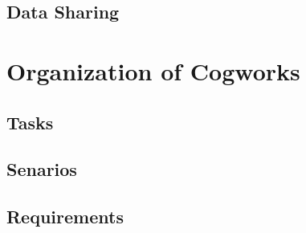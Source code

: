 \subsection{Data Sharing}

\section {Organization of Cogworks}

\subsection{Tasks}

\subsection{Senarios}

\subsection {Requirements}